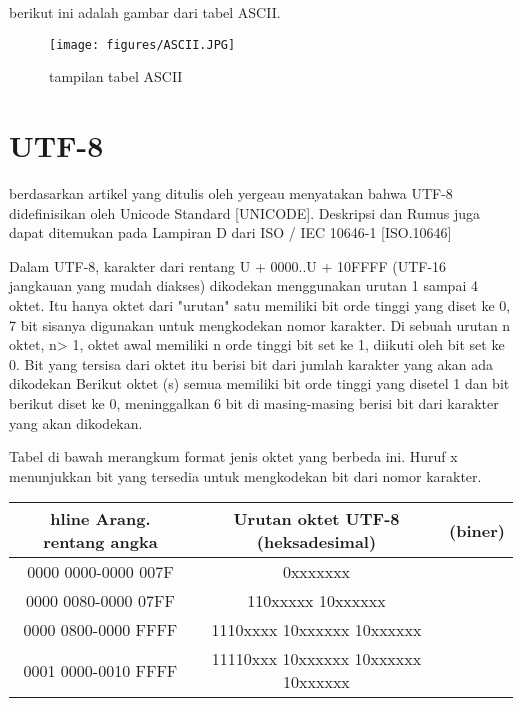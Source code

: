 \begin{enumerate}
 	berikut ini adalah gambar dari tabel ASCII.
 	\begin{figure}[ht]
\centerline{\texttt{[image: figures/ASCII.JPG]}}
\caption{tampilan tabel ASCII}
\label{ASCII}
\end{figure}

	\section{UTF-8}
	 berdasarkan artikel yang ditulis oleh yergeau menyatakan bahwa \cite{yergeau1996utf}
		UTF-8 didefinisikan oleh Unicode Standard [UNICODE]. Deskripsi dan
   Rumus juga dapat ditemukan pada Lampiran D dari ISO / IEC 10646-1 [ISO.10646]

   Dalam UTF-8, karakter dari rentang U + 0000..U + 10FFFF (UTF-16
   jangkauan yang mudah diakses) dikodekan menggunakan urutan 1 sampai 4 oktet. Itu
   hanya oktet dari "urutan" satu memiliki bit orde tinggi yang diset ke 0,
   7 bit sisanya digunakan untuk mengkodekan nomor karakter. Di sebuah
   urutan n oktet, n> 1, oktet awal memiliki n orde tinggi
   bit set ke 1, diikuti oleh bit set ke 0. Bit yang tersisa dari
   oktet itu berisi bit dari jumlah karakter yang akan ada
   dikodekan Berikut oktet (s) semua memiliki bit orde tinggi yang disetel
   1 dan bit berikut diset ke 0, meninggalkan 6 bit di masing-masing berisi
   bit dari karakter yang akan dikodekan.

   Tabel di bawah merangkum format jenis oktet yang berbeda ini.
   Huruf x menunjukkan bit yang tersedia untuk mengkodekan bit dari
   nomor karakter.
 \begin{table}[H]
 \begin{tabular}{|c|c|c}
 hline
 Arang. rentang angka & Urutan oktet UTF-8
 (heksadesimal) & (biner)\\
 \hline
 0000 0000-0000 007F & 0xxxxxxx\\
 0000 0080-0000 07FF & 110xxxxx 10xxxxxx\\
 0000 0800-0000 FFFF & 1110xxxx 10xxxxxx 10xxxxxx\\
 0001 0000-0010 FFFF & 11110xxx 10xxxxxx 10xxxxxx 10xxxxxx\\
\hline
\end{tabular}
\end{table}


\end{enumerate}
